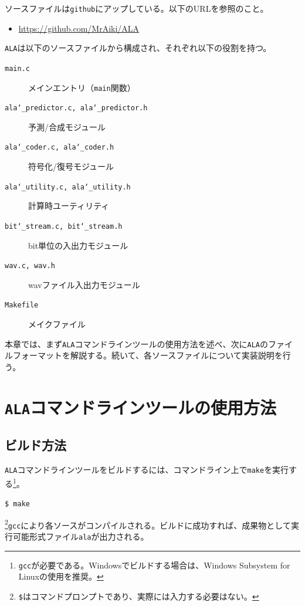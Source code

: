 \documentclass[uplatex,dvipdfmx,b5j,10pt]{jsbook}
\theoremstyle{definition}
\begin{document}
ソースファイルは\texttt{github}にアップしている。以下のURLを参照のこと。
\begin{itemize}
  \item \url{https://github.com/MrAiki/ALA}
\end{itemize}

\texttt{ALA}は以下のソースファイルから構成され、それぞれ以下の役割を持つ。
\begin{description}
  \item[\texttt{main.c}] メインエントリ（\texttt{main}関数）
  \item[\texttt{ala\char`_predictor.c, ala\char`_predictor.h}] 予測/合成モジュール
  \item[\texttt{ala\char`_coder.c, ala\char`_coder.h}] 符号化/復号モジュール
  \item[\texttt{ala\char`_utility.c, ala\char`_utility.h}] 計算時ユーティリティ
  \item[\texttt{bit\char`_stream.c, bit\char`_stream.h}] bit単位の入出力モジュール
  \item[\texttt{wav.c, wav.h}] wavファイル入出力モジュール
  \item[\texttt{Makefile}] メイクファイル
\end{description}

本章では、まず\texttt{ALA}コマンドラインツールの使用方法を述べ、次に\texttt{ALA}のファイルフォーマットを解説する。続いて、各ソースファイルについて実装説明を行う。

\section{\texttt{ALA}コマンドラインツールの使用方法}

\subsection{ビルド方法}

\texttt{ALA}コマンドラインツールをビルドするには、コマンドライン上で\texttt{make}を実行する\footnote{\texttt{gcc}が必要である。Windowsでビルドする場合は、Windows Subsystem for Linuxの使用を推奨。}。
\begin{flushleft}
  \texttt{\$ make}
\end{flushleft}

\footnote{\texttt{\$}はコマンドプロンプトであり、実際には入力する必要はない。}\texttt{gcc}により各ソースがコンパイルされる。ビルドに成功すれば、成果物として実行可能形式ファイル\texttt{ala}が出力される。
\end{document}

